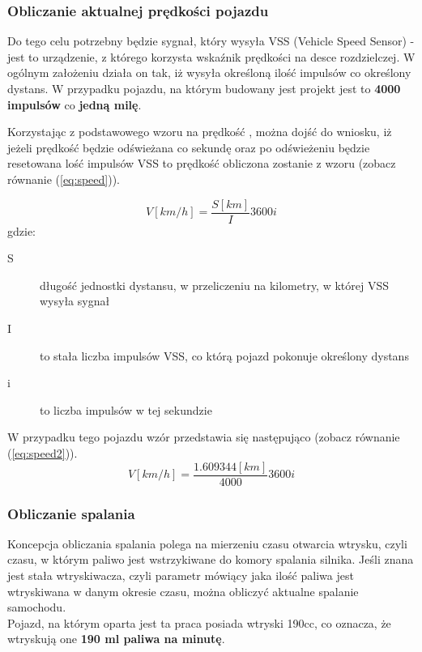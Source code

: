 \subsubsection{Obliczanie aktualnej prędkości pojazdu} \label{calc_speed}
Do tego celu potrzebny będzie sygnał, który wysyła VSS (Vehicle Speed Sensor) - jest to urządzenie, z którego korzysta wskaźnik prędkości na desce rozdzielczej. W ogólnym założeniu działa on tak, iż wysyła określoną ilość impulsów co określony dystans. W przypadku pojazdu, na którym budowany jest projekt jest to \textbf{4000 impulsów} co \textbf{jedną milę}.
\par Korzystając z podstawowego wzoru na prędkość \cite{fizyka}, można dojść do wniosku, iż jeżeli prędkość będzie odświeżana co sekundę oraz po odświeżeniu będzie resetowana lość impulsów VSS to prędkość obliczona zostanie z wzoru (zobacz równanie (\ref{eq:speed})).

\begin{equation}\label{eq:speed}
V[km/h] = \frac{S[km]}{I} 3600 i
\end{equation}
gdzie:
\begin{description}
\item[S] długość jednostki dystansu, w przeliczeniu na kilometry, w której VSS wysyła sygnał
\item[I] to stała liczba impulsów VSS, co którą pojazd pokonuje określony dystans
\item[i] to liczba impulsów w tej sekundzie
\end{description}
W przypadku tego pojazdu wzór przedstawia się następująco (zobacz równanie (\ref{eq:speed2})).
\begin{equation}\label{eq:speed2}
V[km/h] = \frac{1.609344[km]}{4000} 3600i
\end{equation}

\subsubsection{Obliczanie spalania} \label{calc_consumption}
Koncepcja obliczania spalania polega na mierzeniu czasu otwarcia wtrysku, czyli czasu, w którym paliwo jest wstrzykiwane do komory spalania silnika. Jeśli znana jest stała wtryskiwacza, czyli parametr mówiący jaka ilość paliwa jest wtryskiwana w danym okresie czasu, można obliczyć aktualne spalanie samochodu.\\
Pojazd, na którym oparta jest ta praca posiada wtryski 190cc, co oznacza, że wtryskują one \textbf{190 ml paliwa na minutę}.

